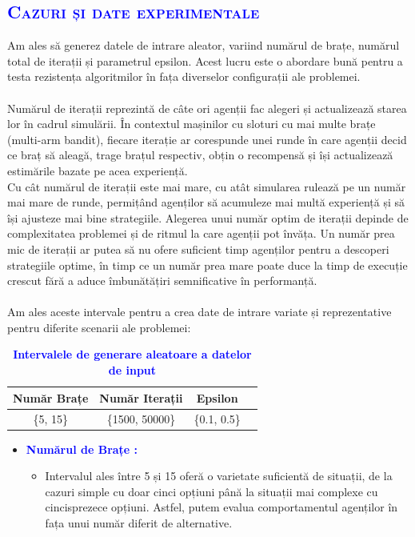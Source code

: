 \documentclass{article}
\begin{document}
\newpage
	\begin{center}
	    \textcolor{blue}{\section{\bfseries\scshape\textcolor{blue}{Cazuri și date experimentale}}}
	\end{center}
Am ales să generez datele de intrare aleator, variind numărul de brațe, numărul total de iterații și parametrul epsilon. Acest lucru este o abordare bună pentru a testa rezistența algoritmilor în fața diverselor configurații ale problemei.\\\\
Numărul de iterații reprezintă de câte ori agenții fac alegeri și actualizează starea lor în cadrul simulării. În contextul mașinilor cu sloturi cu mai multe brațe (multi-arm bandit), fiecare iterație ar corespunde unei runde în care agenții decid ce braț să aleagă, trage brațul respectiv, obțin o recompensă și își actualizează estimările bazate pe acea experiență.\\
Cu cât numărul de iterații este mai mare, cu atât simularea rulează pe un număr mai mare de runde, permițând agenților să acumuleze mai multă experiență și să își ajusteze mai bine strategiile. Alegerea unui număr optim de iterații depinde de complexitatea problemei și de ritmul la care agenții pot învăța. Un număr prea mic de iterații ar putea să nu ofere suficient timp agenților pentru a descoperi strategiile optime, în timp ce un număr prea mare poate duce la timp de execuție crescut fără a aduce îmbunătățiri semnificative în performanță.\\\\
Am ales aceste intervale pentru a crea date de intrare variate și reprezentative pentru diferite scenarii ale problemei:
\begin{table}[ht]
\centering
\begin{tabular}{|c|c|c|c|}
\hline
\textbf{Număr Brațe} & \textbf{Număr Iterații} & \textbf{Epsilon} \\
\hline \{5, 15\} &\{1500, 50000\} &\{0.1,  0.5\} \\
\hline
\end{tabular}
 \bfseries\caption{\textbf{\textcolor{blue}{Intervalele de generare aleatoare a datelor de input}}}
\label{tab:input-data}
\end{table}
\begin{itemize}
\item\textbf{\textcolor{blue}{ Numărul de Brațe :}} 
\begin{itemize}
      \item Intervalul ales între 5 și 15 oferă o varietate suficientă de situații, de la cazuri simple cu doar cinci opțiuni până la situații mai complexe cu cincisprezece opțiuni. Astfel, putem evalua comportamentul agenților în fața unui număr diferit de alternative.
\end{itemize}
\end{itemize}
\end{document}
